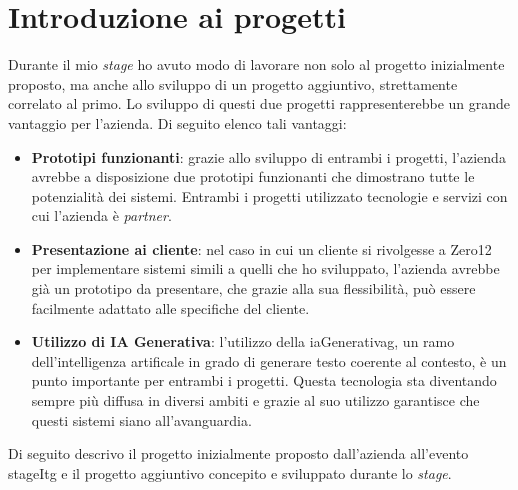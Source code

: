 \section{Introduzione ai progetti}
Durante il mio \textit{stage} ho avuto modo di lavorare non solo al progetto inizialmente proposto, ma anche allo sviluppo di un progetto aggiuntivo, strettamente correlato al primo.
Lo sviluppo di questi due progetti rappresenterebbe un grande vantaggio per l'azienda. Di seguito elenco tali vantaggi:
\begin{itemize}
    \item \textbf{Prototipi funzionanti}: grazie allo sviluppo di entrambi i progetti, l'azienda avrebbe a disposizione due prototipi funzionanti che dimostrano tutte le potenzialità dei sistemi. Entrambi i progetti utilizzato tecnologie e servizi con cui l'azienda è \textit{partner}.
    \item \textbf{Presentazione ai cliente}: nel caso in cui un cliente si rivolgesse a Zero12 per implementare sistemi simili a quelli che ho sviluppato, l'azienda avrebbe già un prototipo da presentare, che grazie alla sua flessibilità, può essere facilmente adattato alle specifiche del cliente.
    \item \textbf{Utilizzo di IA Generativa}: l'utilizzo della \gls{iaGenerativag}, un ramo dell'intelligenza artificale in grado di generare testo coerente al contesto,  è un punto importante per entrambi i progetti. Questa tecnologia sta diventando sempre più diffusa in diversi ambiti e grazie al suo utilizzo garantisce che questi sistemi siano all'avanguardia.
\end{itemize}
\noindent
Di seguito descrivo il progetto inizialmente proposto dall'azienda all'evento \gls{stageItg} e il progetto aggiuntivo concepito e sviluppato durante lo \textit{stage}.
